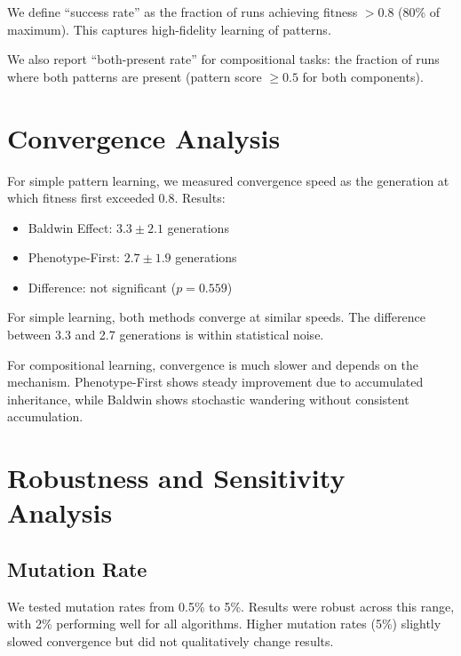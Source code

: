 \documentclass[twocolumn]{article}
\begin{document}
We define ``success rate'' as the fraction of runs achieving fitness $> 0.8$ (80\% of maximum). This captures high-fidelity learning of patterns.

We also report ``both-present rate'' for compositional tasks: the fraction of runs where both patterns are present (pattern score $\geq 0.5$ for both components).


\section*{Convergence Analysis}

For simple pattern learning, we measured convergence speed as the generation at which fitness first exceeded 0.8. Results:

\begin{itemize}
\item Baldwin Effect: $3.3 \pm 2.1$ generations
\item Phenotype-First: $2.7 \pm 1.9$ generations
\item Difference: not significant ($p = 0.559$)
\end{itemize}

For simple learning, both methods converge at similar speeds. The difference between 3.3 and 2.7 generations is within statistical noise.

For compositional learning, convergence is much slower and depends on the mechanism. Phenotype-First shows steady improvement due to accumulated inheritance, while Baldwin shows stochastic wandering without consistent accumulation.


\section*{Robustness and Sensitivity Analysis}

\subsection*{Mutation Rate}

We tested mutation rates from 0.5\% to 5\%. Results were robust across this range, with 2\% performing well for all algorithms. Higher mutation rates (5\%) slightly slowed convergence but did not qualitatively change results.
\end{document}
